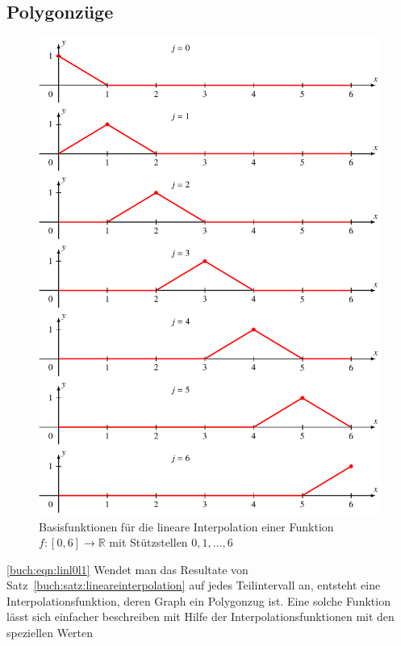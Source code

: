 \subsection{Polygonzüge
\label{buch:subsection:polygonzuege}}
\begin{figure}
\centering
\includegraphics{chapters/30-interpolation/figures/polygon.pdf}
\caption{Basisfunktionen für die lineare Interpolation einer 
Funktion $f\colon[0,6]\to\mathbb R$ mit Stützstellen $0,1,\dots,6$
\label{buch:figure:polygonbasis}}
\end{figure}
\eqref{buch:eqn:linl0l1}
Wendet man das Resultate von Satz~\ref{buch:satz:lineareinterpolation}
auf jedes Teilintervall an, entsteht eine Interpolationsfunktion, deren
Graph ein Polygonzug ist.
%
%
%
Eine solche Funktion lässt sich einfacher beschreiben mit Hilfe
der Interpolationsfunktionen mit den speziellen Werten

